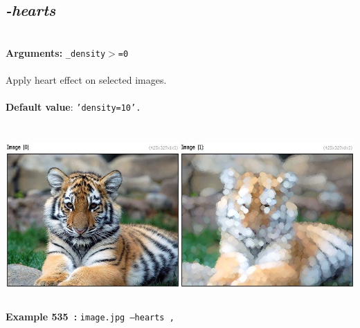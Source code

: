 \documentclass[a4paper,11pt,twoside]{book}
\begin{document}
\subsection{\emph{-hearts} }\vspace*{-0.5em}
~\\\textbf{Arguments: } 
{\small \texttt{\_density$>$=0}}\\~\\
Apply heart effect on selected images.
~\\~\\\textbf{Default value}: {\small \texttt{'density=10'.}}
\begin{center}\includegraphics[keepaspectratio=true,height=7cm,width=\textwidth]{img/gmic_def535.jpg}\\
{\footnotesize \textbf{Example 535~:} \texttt{image.jpg --hearts ,}}
\end{center}
\end{document}
